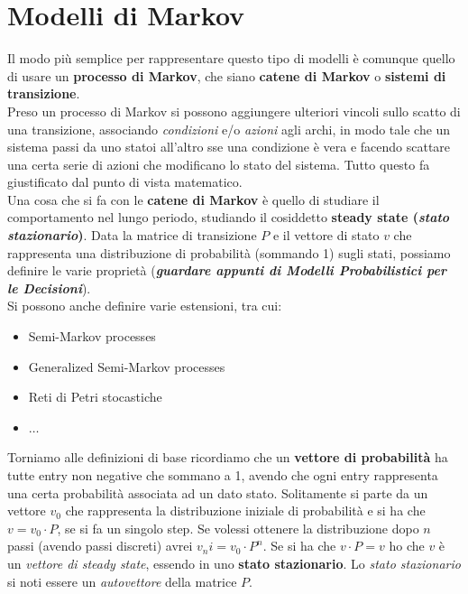 \documentclass[a4paper,12pt, oneside]{book}
\begin{document}
\section{Modelli di Markov}
Il modo più semplice per rappresentare questo tipo di modelli è comunque quello
di usare un \textbf{processo di Markov}, che siano \textbf{catene di Markov} o
\textbf{sistemi di transizione}.\\
Preso un processo di Markov si possono aggiungere ulteriori vincoli sullo scatto
di una transizione, associando \textit{condizioni} e/o \textit{azioni} agli
archi, in modo tale che un sistema passi da uno statoi all'altro sse una
condizione è vera e facendo scattare una certa serie di azioni che modificano lo
stato del sistema. Tutto questo fa giustificato dal punto di vista
matematico. \\
Una cosa che si fa con le \textbf{catene di Markov} è quello di studiare il
comportamento nel lungo periodo, studiando il cosiddetto \textbf{steady state
  (\textit{stato stazionario})}. Data la matrice di transizione $P$ e il vettore
di stato $v$ che rappresenta una distribuzione di probabilità (sommando 1) sugli
stati, possiamo definire le varie proprietà (\textbf{\textit{guardare appunti di
    Modelli Probabilistici per le Decisioni}}). \\
Si possono anche definire varie estensioni, tra cui:
\begin{itemize}
  \item Semi-Markov processes
  \item Generalized Semi-Markov processes
  \item Reti di Petri stocastiche
  \item $\ldots$
\end{itemize}
Torniamo alle definizioni di base ricordiamo che un \textbf{vettore di
  probabilità} ha tutte entry non negative che sommano a 1, avendo che ogni
entry rappresenta una certa probabilità associata ad un dato stato. Solitamente
si parte da un vettore $v_0$ che rappresenta la distribuzione iniziale di
probabilità e si ha che $v=v_{0}\cdot P$, se si fa un singolo
step. Se volessi ottenere la distribuzione dopo $n$ passi (avendo passi
discreti) avrei $v_ni=v_{0}\cdot P^n$. Se si ha che $v\cdot P = v$ ho che $v$ è
un \textit{vettore di steady state}, essendo in uno \textbf{stato
  stazionario}. Lo \textit{stato stazionario} si noti essere un
\textit{autovettore} della matrice $P$.
\newpage
\end{document}
